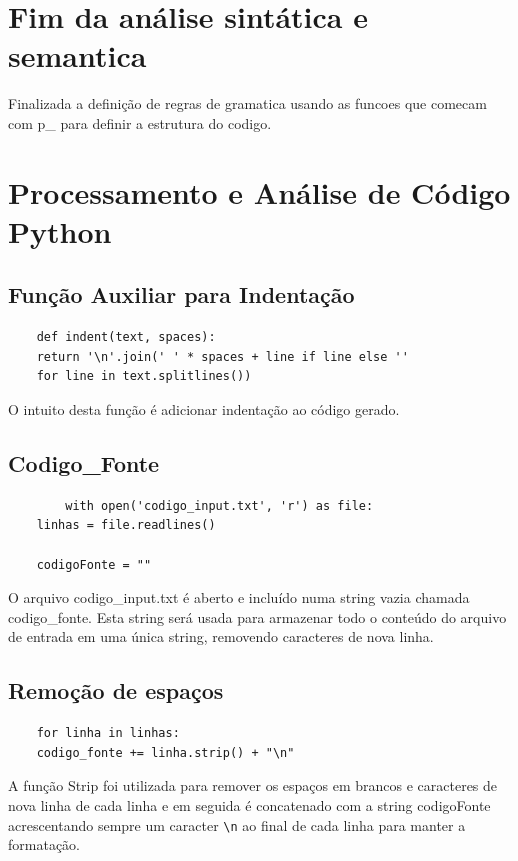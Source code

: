\documentclass[a4paper,12pt]{article}
\begin{document}
\section{Fim da análise sintática e semantica}
Finalizada a definição de regras de gramatica usando as funcoes que 
comecam com p\_ para definir a estrutura do codigo.

\section{Processamento e Análise de Código Python}

\subsection{Função Auxiliar para Indentação}
\begin{verbatim}
    def indent(text, spaces):
    return '\n'.join(' ' * spaces + line if line else '' 
    for line in text.splitlines())
\end{verbatim}
O intuito desta função é adicionar indentação ao código gerado.


\subsection{Codigo\_Fonte}
    \begin{verbatim}
        with open('codigo_input.txt', 'r') as file:
    linhas = file.readlines()

    codigoFonte = ""

\end{verbatim}   
O arquivo codigo\_input.txt é aberto e incluído numa string vazia 
chamada codigo\_fonte. Esta string será usada para armazenar todo o 
conteúdo do arquivo de entrada em uma única string, removendo caracteres 
de nova linha.

\subsection{Remoção de espaços}
\begin{verbatim}
    for linha in linhas:
    codigo_fonte += linha.strip() + "\n"

\end{verbatim}
A função Strip foi utilizada para remover os espaços em brancos e 
caracteres de nova linha de cada linha e em seguida é concatenado com a 
string codigoFonte acrescentando sempre um caracter 
\texttt{\textbackslash n} ao final de cada linha para manter a 
formatação.
\end{document}
